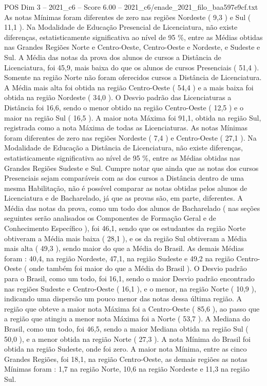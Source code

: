 \begin{textsample}{POS Dim 3 – 2021\_c6 – Score 6.00 – 2021\_c6/enade\_2021\_filo\_baa597e9cf.txt}
As notas Mínimas foram diferentes de zero nas regiões Nordeste ( 9,3 ) e Sul ( 11,1 ).
Na Modalidade de Educação Presencial de Licenciatura, não existe diferenças, estatisticamente significativa ao nível de 95 \%, entre as Médias obtidas nas Grandes Regiões Norte e Centro-Oeste, Centro-Oeste e Nordeste, e Sudeste e Sul.
A Média das notas da prova dos alunos de cursos a Distância de Licenciatura, foi 45,9, mais baixa do que os alunos de cursos Presenciais ( 51,4 ).
Somente na região Norte não foram oferecidos cursos a Distância de Licenciatura.
A Média mais alta foi obtida na região Centro-Oeste ( 54,4 ) e a mais baixa foi obtida na região Nordeste ( 34,0 ).
O Desvio padrão das Licenciaturas a Distância foi 16,6, sendo o menor obtido na região Centro-Oeste ( 12,5 ) e o maior na região Sul ( 16,5 ).
A maior nota Máxima foi 91,1, obtida na região Sul, registrada como a nota Máxima de todas as Licenciaturas.
As notas Mínimas foram diferentes de zero nas regiões Nordeste ( 7,4 ) e Centro-Oeste ( 27,1 ).
Na Modalidade de Educação a Distância de Licenciatura, não existe diferenças, estatisticamente significativa ao nível de 95 \%, entre as Médias obtidas nas Grandes Regiões Sudeste e Sul.
Cumpre notar que ainda que as notas dos cursos Presenciais sejam comparáveis com as dos cursos a Distância dentro de uma mesma Habilitação, não é possível comparar as notas obtidas pelos alunos de Licenciatura e de Bacharelado, já que as provas são, em parte, diferentes.
A Média das notas da prova, como um todo dos alunos de Bacharelado ( nas seções seguintes serão analisados os Componentes de Formação Geral e de Conhecimento Específico ), foi 46,1, sendo que os estudantes da região Norte obtiveram a Média mais baixa ( 28,1 ), e os da região Sul obtiveram a Média mais alta ( 49,3 ), sendo maior do que a Média do Brasil.
As demais Médias foram : 40,4, na região Nordeste, 47,1, na região Sudeste e 49,2 na região Centro-Oeste ( onde também foi maior do que a Média do Brasil ).
O Desvio padrão para o Brasil, como um todo, foi 16,1, sendo o maior Desvio padrão encontrado nas regiões Sudeste e Centro-Oeste ( 16,1 ), e o menor, na região Norte ( 10,9 ), indicando uma dispersão um pouco menor das notas dessa última região.
A região que obteve a maior nota Máxima foi a Centro-Oeste ( 85,6 ), ao passo que a região que atingiu a menor nota Máxima foi a Norte ( 53,7 ).
A Mediana do Brasil, como um todo, foi 46,5, sendo a maior Mediana obtida na região Sul ( 50,0 ), e a menor obtida na região Norte ( 27,3 ).
A nota Mínima do Brasil foi obtida na região Sudeste, onde foi zero.
A maior nota Mínima, entre as cinco Grandes Regiões, foi 18,1, na região Centro-Oeste, as demais regiões as notas Mínimas foram : 1,7 na região Norte, 10,6 na região Nordeste e 11,3 na região Sul.

\end{textsample}

